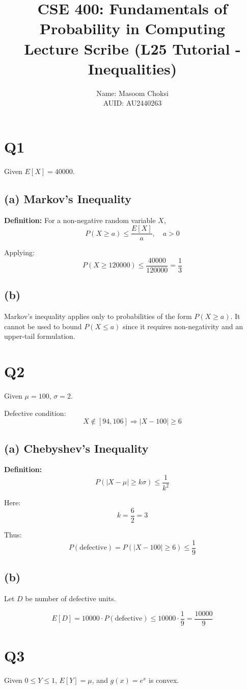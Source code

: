 \documentclass[12pt]{article}
\title{CSE 400: Fundamentals of Probability in Computing \\ Lecture Scribe (L25 Tutorial - Inequalities)}
\author{Name: Masoom Choksi \\ AUID: AU2440263}
\date{}
\begin{document}
\maketitle

\section*{Q1}
Given $E[X] = 40000$.

\subsection*{(a) Markov's Inequality}
\textbf{Definition:} For a non-negative random variable $X$,
\[
P(X \geq a) \leq \frac{E[X]}{a}, \quad a > 0
\]

Applying:
\[
P(X \geq 120000) \leq \frac{40000}{120000} = \frac{1}{3}
\]

\subsection*{(b)}
Markov's inequality applies only to probabilities of the form $P(X \geq a)$. It cannot be used to bound $P(X \leq a)$ since it requires non-negativity and an upper-tail formulation.

\section*{Q2}
Given $\mu = 100$, $\sigma = 2$.

Defective condition:
\[
X \notin [94,106] \Rightarrow |X - 100| \geq 6
\]

\subsection*{(a) Chebyshev's Inequality}
\textbf{Definition:}
\[
P(|X - \mu| \geq k\sigma) \leq \frac{1}{k^2}
\]

Here:
\[
k = \frac{6}{2} = 3
\]

Thus:
\[
P(\text{defective}) = P(|X - 100| \geq 6) \leq \frac{1}{9}
\]

\subsection*{(b)}
Let $D$ be number of defective units.

\[
E[D] = 10000 \cdot P(\text{defective}) \leq 10000 \cdot \frac{1}{9} = \frac{10000}{9}
\]

\section*{Q3}
Given $0 \leq Y \leq 1$, $E[Y] = \mu$, and $g(x)=e^x$ is convex.
\end{document}
